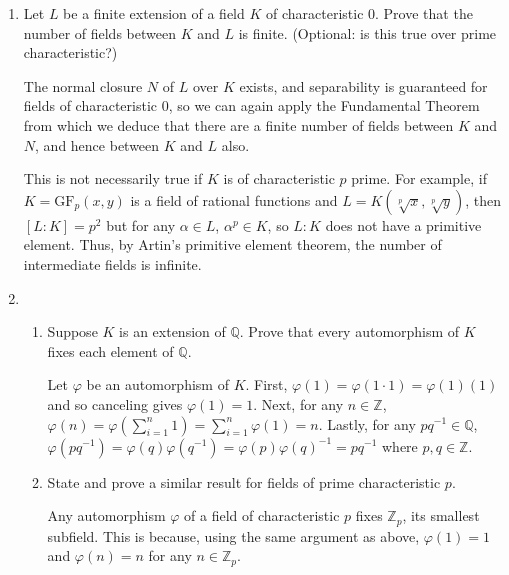 \documentclass[12pt]{article}
\newcommand{\QQ}{\mathbb{Q}}
\begin{document}
\begin{enumerate}
    \item
        Let $L$ be a finite extension of a field $K$ of characteristic $0$. Prove that the number of fields between $K$ and $L$ is finite. (Optional: is this true over prime characteristic?) \par
        The normal closure $N$ of $L$ over $K$ exists, and separability is guaranteed for fields of characteristic $0$, so we can again apply the Fundamental Theorem from which we deduce that there are a finite number of fields between $K$ and $N$, and hence between $K$ and $L$ also. \par
        This is not necessarily true if $K$ is of characteristic $p$ prime. For example, if $K = \text{GF}_p(x, y)$ is a field of rational functions and $L = K(\sqrt[p]x, \sqrt[p]y)$, then $[L : K] = p^2$ but for any $\alpha \in L$, $\alpha^p \in K$, so $L : K$ does not have a primitive element. Thus, by Artin's primitive element theorem, the number of intermediate fields is infinite.

    \item
        \begin{enumerate}
            \item
                Suppose $K$ is an extension of $\QQ$.  Prove that every automorphism of $K$ fixes each element of $\QQ$. \par
                Let $\varphi$ be an automorphism of $K$. First, $\varphi(1) = \varphi(1 \cdot 1) = \varphi(1)(1)$ and so canceling gives $\varphi(1) = 1$. Next, for any $n \in \mathbb{Z}$, $\varphi(n) = \varphi(\sum_{i = 1}^n 1) = \sum_{i = 1}^n \varphi(1) = n$. Lastly, for any $pq^{-1} \in \mathbb{Q}$, $\varphi(pq^{-1}) = \varphi(q) \varphi(q^{-1}) = \varphi(p) \varphi(q)^{-1} = pq^{-1}$ where $p, q \in \mathbb{Z}$.
            \item
                State and prove a similar result for fields of prime characteristic $p$. \par
                Any automorphism $\varphi$ of a field of characteristic $p$ fixes $\mathbb{Z}_p$, its smallest subfield. This is because, using the same argument as above, $\varphi(1) = 1$ and $\varphi(n) = n$ for any $n \in \mathbb{Z}_p$.
        \end{enumerate}


\end{enumerate}
\end{document}
